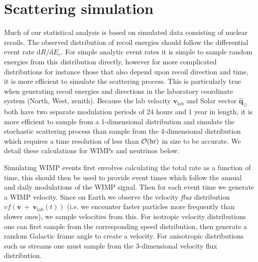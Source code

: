 \chapter{Scattering simulation}\label{app:scattering}
Much of our statistical analysis is based on simulated data consisting of nuclear recoils. The observed distribution of recoil energies should follow the differential event rate $\textrm{d}R/\textrm{d}E_r$. For simple analytic event rates it is simple to sample random energies from this distribution directly, however for more complicated distributions for instance those that also depend upon recoil direction and time, it is more efficient to simulate the scattering process. This is particularly true when generating recoil energies and directions in the laboratory coordinate system (North, West, zenith). Because the lab velocity $\textbf{v}_\textrm{lab}$ and Solar vector $\hat{\textbf{q}}_\odot$ both have two separate modulation periods of 24 hours and 1 year in length, it is more efficient to sample from a 1-dimensional distribution and simulate the stochastic scattering process than sample from the 4-dimensional distribution which requires a time resolution of less than $\mathcal{O}({\rm hr})$ in size to be accurate. We detail these calculations for WIMPs and neutrinos below. 

Simulating WIMP events first envolves calculating the total rate as a function of time, this should then be used to provide event times which follow the annual and daily modulations of the WIMP signal. Then for each event time we generate a WIMP velocity. Since on Earth we observe the velocity {\it flux} distribution $v f(\textbf{v}~+~\textbf{v}_\textrm{lab}(t))$ (i.e. we encounter faster particles more frequently than slower ones), we sample velocities from this. For isotropic velocity distributions one can first sample from the corresponding speed distribution, then generate a random Galactic frame angle to create a velocity. For anisotropic distributions such as streams one must sample from the 3-dimensional velocity flux distribution.

